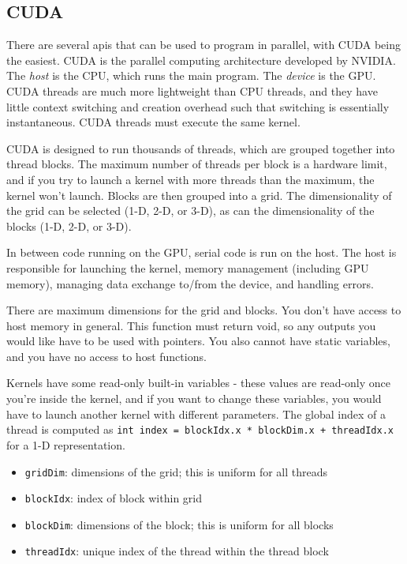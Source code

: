 \documentclass[10pt]{article}
\begin{document}
\begin{flushleft}
\subsection{CUDA}

There are several \gls{api}s that can be used to program in parallel, with CUDA being the easiest. CUDA is the parallel computing architecture developed by NVIDIA. The \textit{host} is the CPU, which runs the main program. The \textit{device} is the GPU. CUDA threads are much more lightweight than CPU threads, and they have little context switching and creation overhead such that switching is essentially instantaneous. CUDA threads must execute the same kernel. 

CUDA is designed to run thousands of threads, which are grouped together into thread blocks. The maximum number of threads per block is a hardware limit, and if you try to launch a kernel with more threads than the maximum, the kernel won't launch. Blocks are then grouped into a grid. The dimensionality of the grid can be selected (1-D, 2-D, or 3-D), as can the dimensionality of the blocks (1-D, 2-D, or 3-D). 

In between code running on the GPU, serial code is run on the host. The host is responsible for launching the kernel, memory management (including GPU memory), managing data exchange to/from the device, and handling errors. 

There are maximum dimensions for the grid and blocks. You don't have access to host memory in general. This function must return void, so any outputs you would like have to be used with pointers. You also cannot have static variables, and you have no access to host functions. 

Kernels have some read-only built-in variables - these values are read-only once you're inside the kernel, and if you want to change these variables, you would have to launch another kernel with different parameters. The global index of a thread is computed as {\tt int index = blockIdx.x * blockDim.x + threadIdx.x} for a 1-D representation. 

\begin{itemize}
\item {\tt gridDim}: dimensions of the grid; this is uniform for all threads
\item {\tt blockIdx}: index of block within grid
\item {\tt blockDim}: dimensions of the block; this is uniform for all blocks
\item {\tt threadIdx}: unique index of the thread within the thread block
\end{itemize}


\end{flushleft}
\end{document}

